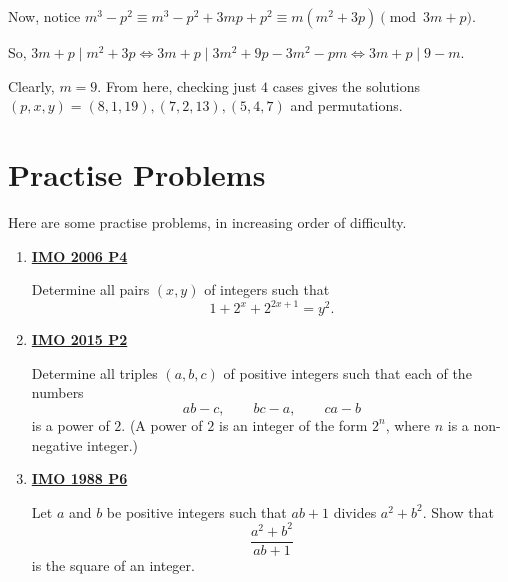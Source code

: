 \documentclass[10pt,letterpaper]{article}
\begin{document}
Now, notice $m^3-p^2\equiv m^3-p^2+3mp+p^2\equiv m(m^2+3p)\pmod{3m+p}$.

So, $3m+p\mid m^2+3p\iff 3m+p\mid 3m^2+9p-3m^2-pm\iff 3m+p\mid 9-m$.

Clearly, $m=9$. From here, checking just $4$ cases gives the solutions $(p,x,y)=(8,1,19), (7,2,13), (5,4,7)$ and permutations.
\nopagebreak[4]\par{}
\par\vspace{12pt}\newpage
\section{Practise Problems}
Here are some practise problems, in increasing order of difficulty.
\begin{enumerate}
\item \textbf{\href{https://www.imo-official.org/assets/documents/problems/2006/2006_eng.pdf}{IMO 2006 P4}}

Determine all pairs $(x,y)$ of integers such that\[1+2^x+2^{2x+1}=y^2.\]
\item \textbf{\href{https://www.imo-official.org/assets/documents/problems/2015/2015_eng.pdf}{IMO 2015 P2}}

Determine all triples $(a,b,c)$ of positive integers such that each of the numbers\[ab-c,\qquad bc-a,\qquad ca-b\]is a power of $2$. (A power of $2$ is an integer of the form $2^n$, where $n$ is a non-negative integer.)
\item \textbf{\href{https://www.imo-official.org/assets/documents/problems/1988/1988_eng.pdf}{IMO 1988 P6}}

Let $a$ and $b$ be positive integers such that $ab+1$ divides $a^2+b^2$. Show that\[\frac{a^2+b^2}{ab+1}\]is the square of an integer.
\end{enumerate}
\end{document}
